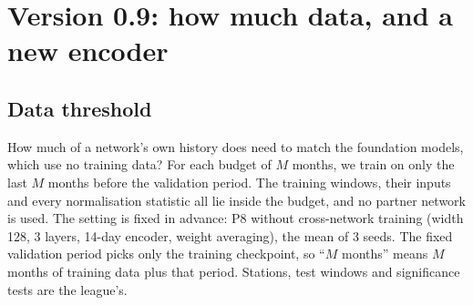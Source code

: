 \section{Version 0.9: how much data, and a new encoder}\label{sec:v09}

\subsection{Data threshold}

How much of a network's own history does \pwm need to match the foundation models, which use no training data?
For each budget of $M$ months, we train \pwm on only the last $M$ months before the validation period. The training
windows, their inputs and every normalisation statistic all lie inside the budget, and no partner network is used.
The setting is fixed in advance: P8 without cross-network training (width 128, 3 layers, 14-day encoder, weight
averaging), the mean of 3 seeds. The fixed validation period picks only the training checkpoint, so ``$M$ months''
means $M$ months of training data plus that period. Stations, test windows and significance tests are the league's.

